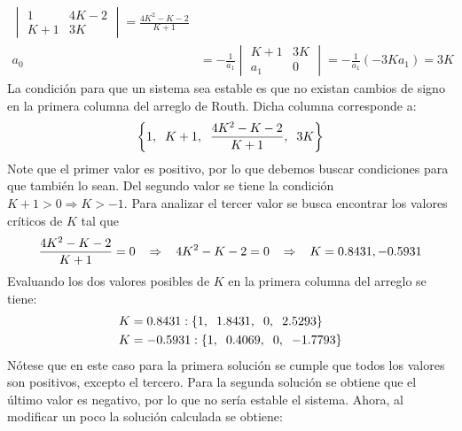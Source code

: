 \documentclass[11pt, spanish]{article}
\begin{document}
\begin{description}
\begin{align*}
\begin{vmatrix}
					1 & 4K-2\\
					K+1 & 3K
				\end{vmatrix} = \frac{4K^2-K-2}{K+1}\\
				a_0 &= -\frac{1}{a_1}
				\begin{vmatrix}
					K+1 & 3K\\
					a_1 & 0
				\end{vmatrix} = -\frac{1}{a_1}(-3K a_1) = 3K
			\end{align*}
			La condición para que un sistema sea estable es que no existan cambios de signo en la primera columna del arreglo de Routh. Dicha columna corresponde a:
			\begin{equation*}
					\left\{1,\hspace*{2mm} K+1,\hspace*{2mm} \frac{4K^2-K-2}{K+1},\hspace*{2mm} 3K\right\}
			\end{equation*}
			Note que el primer valor es positivo, por lo que debemos buscar condiciones para que también lo sean. Del segundo valor se tiene la condición $K+1 > 0 \Rightarrow K>-1$. Para analizar el tercer valor se busca encontrar los valores críticos de $K$ tal que
			\begin{equation*}
				\frac{4K^2-K-2}{K+1} = 0\hspace*{3mm} \Rightarrow\hspace*{3mm} 4K^2-K-2=0\hspace*{3mm} \Rightarrow\hspace*{3mm} K = {0.8431, -0.5931}
			\end{equation*}
			Evaluando los dos valores posibles de $K$ en la primera columna del arreglo se tiene:
			\begin{align*}
				K &= 0.8431: \{1,\hspace*{2mm} 1.8431,\hspace*{2mm} 0,\hspace*{2mm} 2.5293\}\\
				K &= -0.5931: \{1,\hspace*{2mm} 0.4069,\hspace*{2mm} 0,\hspace*{2mm} -1.7793\}
			\end{align*}
			Nótese que en este caso para la primera solución se cumple que todos los valores son positivos, excepto el tercero. Para la segunda solución se obtiene que el último valor es negativo, por lo que no sería estable el sistema. Ahora, al modificar un poco la solución calculada se obtiene:
			\begin{align*}

\end{align*}
\end{description}
\end{document}
